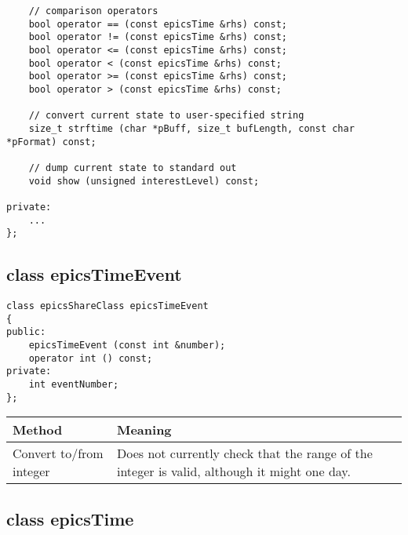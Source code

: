 \begin{verbatim}
    // comparison operators
    bool operator == (const epicsTime &rhs) const;
    bool operator != (const epicsTime &rhs) const;
    bool operator <= (const epicsTime &rhs) const;
    bool operator < (const epicsTime &rhs) const;
    bool operator >= (const epicsTime &rhs) const;
    bool operator > (const epicsTime &rhs) const;

    // convert current state to user-specified string
    size_t strftime (char *pBuff, size_t bufLength, const char *pFormat) const;

    // dump current state to standard out
    void show (unsigned interestLevel) const;

private:
    ...
};
\end{verbatim}

\subsection{class epicsTimeEvent}

\begin{verbatim}
class epicsShareClass epicsTimeEvent
{
public:
    epicsTimeEvent (const int &number);
    operator int () const;
private:
    int eventNumber;
};
\end{verbatim}
\begin{center}
\begin{longtable}{p{1.79167in}p{4.94833in}}
\textbf{Method} & \textbf{Meaning}\\
\hline
Convert to/from integer & Does not currently check that the range of the integer is valid, although it might one day.
\end{longtable}

\end{center}


\subsection{class epicsTime}

